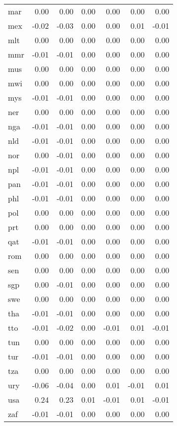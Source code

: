 \documentclass[10pt]{article}
\begin{document}
\begin{longtable}[t]{lrrrrrr}
\addlinespace
mar & 0.00 & 0.00 & 0.00 & 0.00 & 0.00 & 0.00\\
mex & -0.02 & -0.03 & 0.00 & 0.00 & 0.01 & -0.01\\
mlt & 0.00 & 0.00 & 0.00 & 0.00 & 0.00 & 0.00\\
mmr & -0.01 & -0.01 & 0.00 & 0.00 & 0.00 & 0.00\\
mus & 0.00 & 0.00 & 0.00 & 0.00 & 0.00 & 0.00\\
\addlinespace
mwi & 0.00 & 0.00 & 0.00 & 0.00 & 0.00 & 0.00\\
mys & -0.01 & -0.01 & 0.00 & 0.00 & 0.00 & 0.00\\
ner & 0.00 & 0.00 & 0.00 & 0.00 & 0.00 & 0.00\\
nga & -0.01 & -0.01 & 0.00 & 0.00 & 0.00 & 0.00\\
nld & -0.01 & -0.01 & 0.00 & 0.00 & 0.00 & 0.00\\
\addlinespace
nor & 0.00 & -0.01 & 0.00 & 0.00 & 0.00 & 0.00\\
npl & -0.01 & -0.01 & 0.00 & 0.00 & 0.00 & 0.00\\
pan & -0.01 & -0.01 & 0.00 & 0.00 & 0.00 & 0.00\\
phl & -0.01 & -0.01 & 0.00 & 0.00 & 0.00 & 0.00\\
pol & 0.00 & 0.00 & 0.00 & 0.00 & 0.00 & 0.00\\
\addlinespace
prt & 0.00 & 0.00 & 0.00 & 0.00 & 0.00 & 0.00\\
qat & -0.01 & -0.01 & 0.00 & 0.00 & 0.00 & 0.00\\
rom & 0.00 & 0.00 & 0.00 & 0.00 & 0.00 & 0.00\\
sen & 0.00 & 0.00 & 0.00 & 0.00 & 0.00 & 0.00\\
sgp & 0.00 & -0.01 & 0.00 & 0.00 & 0.00 & 0.00\\
\addlinespace
swe & 0.00 & 0.00 & 0.00 & 0.00 & 0.00 & 0.00\\
tha & -0.01 & -0.01 & 0.00 & 0.00 & 0.00 & 0.00\\
tto & -0.01 & -0.02 & 0.00 & -0.01 & 0.01 & -0.01\\
tun & 0.00 & 0.00 & 0.00 & 0.00 & 0.00 & 0.00\\
tur & -0.01 & -0.01 & 0.00 & 0.00 & 0.00 & 0.00\\
\addlinespace
tza & 0.00 & 0.00 & 0.00 & 0.00 & 0.00 & 0.00\\
ury & -0.06 & -0.04 & 0.00 & 0.01 & -0.01 & 0.01\\
usa & 0.24 & 0.23 & 0.01 & -0.01 & 0.01 & -0.01\\
zaf & -0.01 & -0.01 & 0.00 & 0.00 & 0.00 & 0.00\\
\bottomrule
\end{longtable}
\end{document}
